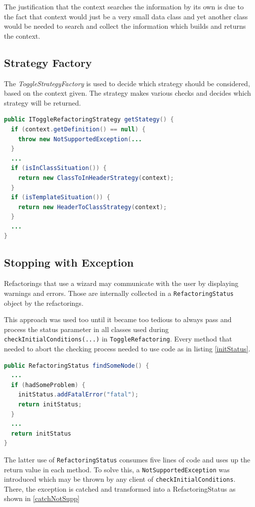 The justification that the context searches the information by its own is due
to the fact that context would just be a very small data class and yet another
class would be needed to search and collect the information which builds and
returns the context.

\subsection{Strategy Factory}
\label{factory}

The \textit{ToggleStrategyFactory} is used to decide which strategy should be 
considered, based on the context given. The strategy makes various checks
and decides which strategy will be returned.

\begin{lstlisting}[caption={IToggleRefactoringStrategy},
label={strategy}, language=Java]
public IToggleRefactoringStrategy getStategy() {
  if (context.getDefinition() == null) {
    throw new NotSupportedException(...
  }
  ...
  if (isInClassSituation()) {
    return new ClassToInHeaderStrategy(context);
  }
  if (isTemplateSituation()) {
    return new HeaderToClassStrategy(context);
  }
  ...
}
\end{lstlisting}

\subsection{Stopping with Exception}
Refactorings that use a wizard may communicate with the user by displaying 
warnings and errors. Those are internally collected in a 
\texttt{RefactoringStatus} object by the refactorings.

This approach was used too until it became too tedious to always pass and 
process the status parameter in all classes used during 
\texttt{checkInitialConditions(...)} in \texttt{ToggleRefactoring}.
Every method that needed to abort the checking process needed to use code as 
in listing \ref{initStatus}.

\begin{lstlisting}[caption={exemplary use of the RefactoringStatus},
label={initStatus}, language=Java]
public RefactoringStatus findSomeNode() {
  ...
  if (hadSomeProblem) {
    initStatus.addFatalError("fatal");
    return initStatus;
  }
  ...
  return initStatus
}
\end{lstlisting}

The latter use of \texttt{RefactoringStatus} consumes five lines of code and 
uses up the return value in each method. To solve this, a 
\texttt{NotSupportedException} was introduced which may be thrown by any client 
of \texttt{checkInitialConditions}. There, the exception is catched and 
transformed into a RefactoringStatus as shown in \ref{catchNotSupp}

